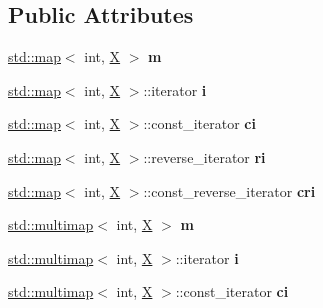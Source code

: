 \subsection*{Public Attributes}
\begin{DoxyCompactItemize}
\item 
\mbox{\label{class_x_afdec5e4636b0325def6b28eef5c20654}} 
\mbox{\hyperlink{classstd_1_1map}{std\+::map}}$<$ int, \mbox{\hyperlink{class_x}{X}} $>$ {\bfseries m}
\item 
\mbox{\label{class_x_ae6c88d179b1e2519a15c99e616bacc8a}} 
\mbox{\hyperlink{classstd_1_1map}{std\+::map}}$<$ int, \mbox{\hyperlink{class_x}{X}} $>$\+::iterator {\bfseries i}
\item 
\mbox{\label{class_x_a1300c838877ab4f8f997ae4ad44cac55}} 
\mbox{\hyperlink{classstd_1_1map}{std\+::map}}$<$ int, \mbox{\hyperlink{class_x}{X}} $>$\+::const\+\_\+iterator {\bfseries ci}
\item 
\mbox{\label{class_x_aecd4a67200b1085c030855db1eb4891e}} 
\mbox{\hyperlink{classstd_1_1map}{std\+::map}}$<$ int, \mbox{\hyperlink{class_x}{X}} $>$\+::reverse\+\_\+iterator {\bfseries ri}
\item 
\mbox{\label{class_x_a58c176c32e8326f337b3934ca7e4cee7}} 
\mbox{\hyperlink{classstd_1_1map}{std\+::map}}$<$ int, \mbox{\hyperlink{class_x}{X}} $>$\+::const\+\_\+reverse\+\_\+iterator {\bfseries cri}
\item 
\mbox{\label{class_x_a4a2ac9565fcffb42ff513eab8a5a3fe0}} 
\mbox{\hyperlink{classstd_1_1multimap}{std\+::multimap}}$<$ int, \mbox{\hyperlink{class_x}{X}} $>$ {\bfseries m}
\item 
\mbox{\label{class_x_a513f4d7aac2864de01e9e66580577682}} 
\mbox{\hyperlink{classstd_1_1multimap}{std\+::multimap}}$<$ int, \mbox{\hyperlink{class_x}{X}} $>$\+::iterator {\bfseries i}
\item 
\mbox{\label{class_x_a32d46054985195560d5ca0a2e800a15a}} 
\mbox{\hyperlink{classstd_1_1multimap}{std\+::multimap}}$<$ int, \mbox{\hyperlink{class_x}{X}} $>$\+::const\+\_\+iterator {\bfseries ci}
\item 
\mbox{\label{class_x_a5a223596074255b0b36d1b7fed2fca9d}} 

\end{DoxyCompactItemize}
